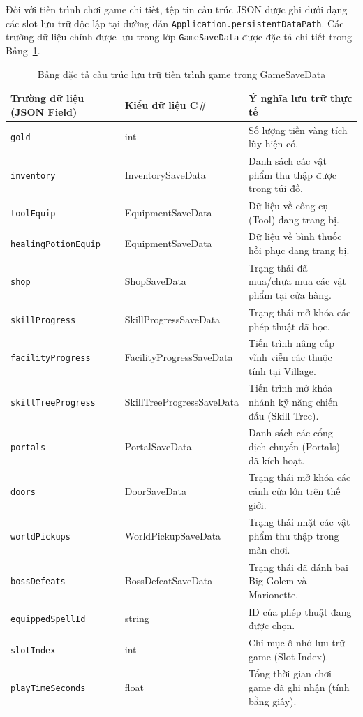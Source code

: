 \documentclass[../DoAn.tex]{subfiles}
\begin{document}
Đối với tiến trình chơi game chi tiết, tệp tin cấu trúc JSON được ghi dưới dạng các slot lưu trữ độc lập tại đường dẫn \texttt{Application.persistentDataPath}. Các trường dữ liệu chính được lưu trong lớp \texttt{GameSaveData} được đặc tả chi tiết trong Bảng~\ref{table:json_save_data}.

\begin{table}[H]
\centering
\begin{tabular}{|p{4.0cm}|p{3.5cm}|p{6.5cm}|}
\hline
\textbf{Trường dữ liệu (JSON Field)} & \textbf{Kiểu dữ liệu C\#} & \textbf{Ý nghĩa lưu trữ thực tế} \\ \hline
\texttt{gold} & int & Số lượng tiền vàng tích lũy hiện có. \\ \hline
\texttt{inventory} & InventorySaveData & Danh sách các vật phẩm thu thập được trong túi đồ. \\ \hline
\texttt{toolEquip} & EquipmentSaveData & Dữ liệu về công cụ (Tool) đang trang bị. \\ \hline
\texttt{healingPotionEquip} & EquipmentSaveData & Dữ liệu về bình thuốc hồi phục đang trang bị. \\ \hline
\texttt{shop} & ShopSaveData & Trạng thái đã mua/chưa mua các vật phẩm tại cửa hàng. \\ \hline
\texttt{skillProgress} & SkillProgressSaveData & Trạng thái mở khóa các phép thuật đã học. \\ \hline
\texttt{facilityProgress} & FacilityProgressSaveData & Tiến trình nâng cấp vĩnh viễn các thuộc tính tại Village. \\ \hline
\texttt{skillTreeProgress} & SkillTreeProgressSaveData & Tiến trình mở khóa nhánh kỹ năng chiến đấu (Skill Tree). \\ \hline
\texttt{portals} & PortalSaveData & Danh sách các cổng dịch chuyển (Portals) đã kích hoạt. \\ \hline
\texttt{doors} & DoorSaveData & Trạng thái mở khóa các cánh cửa lớn trên thế giới. \\ \hline
\texttt{worldPickups} & WorldPickupSaveData & Trạng thái nhặt các vật phẩm thu thập trong màn chơi. \\ \hline
\texttt{bossDefeats} & BossDefeatSaveData & Trạng thái đã đánh bại Big Golem và Marionette. \\ \hline
\texttt{equippedSpellId} & string & ID của phép thuật đang được chọn. \\ \hline
\texttt{slotIndex} & int & Chỉ mục ô nhớ lưu trữ game (Slot Index). \\ \hline
\texttt{playTimeSeconds} & float & Tổng thời gian chơi game đã ghi nhận (tính bằng giây). \\ \hline
\end{tabular}
\caption{Bảng đặc tả cấu trúc lưu trữ tiến trình game trong GameSaveData}
\label{table:json_save_data}
\end{table}
\end{document}
